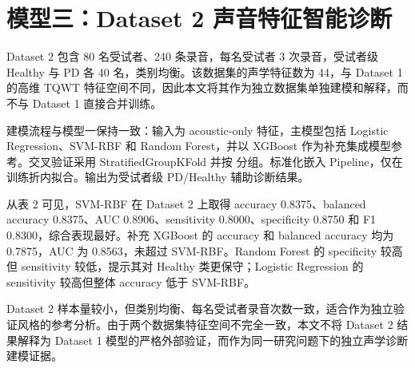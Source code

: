 \section{模型三：Dataset 2 声音特征智能诊断}

Dataset 2 包含 80 名受试者、240 条录音，每名受试者 3 次录音，受试者级 Healthy 与 PD 各 40 名，类别均衡。该数据集的声学特征数为 44，与 Dataset 1 的高维 TQWT 特征空间不同，因此本文将其作为独立数据集单独建模和解释，而不与 Dataset 1 直接合并训练。

建模流程与模型一保持一致：输入为 acoustic-only 特征，主模型包括 Logistic Regression、SVM-RBF 和 Random Forest，并以 XGBoost 作为补充集成模型参考。交叉验证采用 StratifiedGroupKFold 并按  分组。标准化嵌入 Pipeline，仅在训练折内拟合。输出为受试者级 PD/Healthy 辅助诊断结果。

从表 2 可见，SVM-RBF 在 Dataset 2 上取得 accuracy 0.8375、balanced accuracy 0.8375、AUC 0.8906、sensitivity 0.8000、specificity 0.8750 和 F1 0.8300，综合表现最好。补充 XGBoost 的 accuracy 和 balanced accuracy 均为 0.7875，AUC 为 0.8563，未超过 SVM-RBF。Random Forest 的 specificity 较高但 sensitivity 较低，提示其对 Healthy 类更保守；Logistic Regression 的 sensitivity 较高但整体 accuracy 低于 SVM-RBF。

Dataset 2 样本量较小，但类别均衡、每名受试者录音次数一致，适合作为独立验证风格的参考分析。由于两个数据集特征空间不完全一致，本文不将 Dataset 2 结果解释为 Dataset 1 模型的严格外部验证，而作为同一研究问题下的独立声学诊断建模证据。
